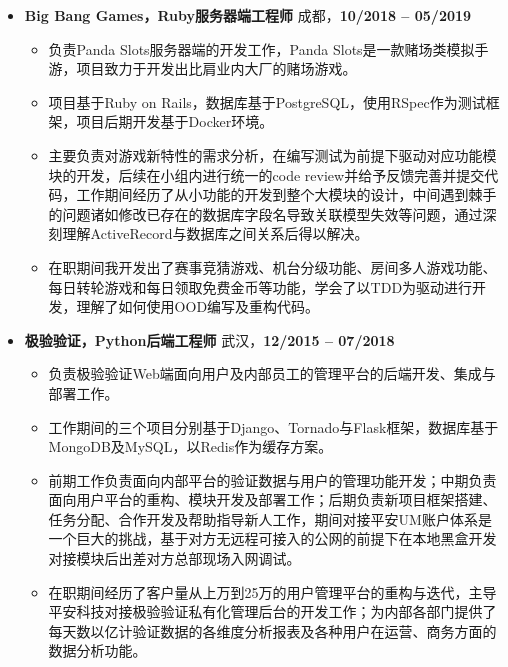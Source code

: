 \documentclass[11pt, a4paper,sans]{moderncv}   %
\begin{document}
\begin{itemize}

  \item{\yahei \textbf{Big Bang Games，Ruby服务器端工程师} \hfill 成都，\textbf{10/2018 -- 05/2019}}
  \begin{itemize}\yahei
    \item 负责Panda Slots服务器端的开发工作，Panda Slots是一款赌场类模拟手游，项目致力于开发出比肩业内大厂的赌场游戏。
    \item 项目基于Ruby on Rails，数据库基于PostgreSQL，使用RSpec作为测试框架，项目后期开发基于Docker环境。
    \item 主要负责对游戏新特性的需求分析，在编写测试为前提下驱动对应功能模块的开发，后续在小组内进行统一的code review并给予反馈完善并提交代码，工作期间经历了从小功能的开发到整个大模块的设计，中间遇到棘手的问题诸如修改已存在的数据库字段名导致关联模型失效等问题，通过深刻理解ActiveRecord与数据库之间关系后得以解决。
    \item 在职期间我开发出了赛事竞猜游戏、机台分级功能、房间多人游戏功能、每日转轮游戏和每日领取免费金币等功能，学会了以TDD为驱动进行开发，理解了如何使用OOD编写及重构代码。
  \end{itemize}

  \vspace{6pt}

  \item{\yahei \textbf{极验验证，Python后端工程师} \hfill 武汉，\textbf{12/2015 -- 07/2018}}

    \begin{itemize}\yahei
      \item 负责极验验证Web端面向用户及内部员工的管理平台的后端开发、集成与部署工作。
      \item 工作期间的三个项目分别基于Django、Tornado与Flask框架，数据库基于MongoDB及MySQL，以Redis作为缓存方案。
      \item 前期工作负责面向内部平台的验证数据与用户的管理功能开发；中期负责面向用户平台的重构、模块开发及部署工作；后期负责新项目框架搭建、任务分配、合作开发及帮助指导新人工作，期间对接平安UM账户体系是一个巨大的挑战，基于对方无远程可接入的公网的前提下在本地黑盒开发对接模块后出差对方总部现场入网调试。
      \item 在职期间经历了客户量从上万到25万的用户管理平台的重构与迭代，主导平安科技对接极验验证私有化管理后台的开发工作；为内部各部门提供了每天数以亿计验证数据的各维度分析报表及各种用户在运营、商务方面的数据分析功能。
    \end{itemize}

\end{itemize}
\vspace{-8pt}
\end{document}

